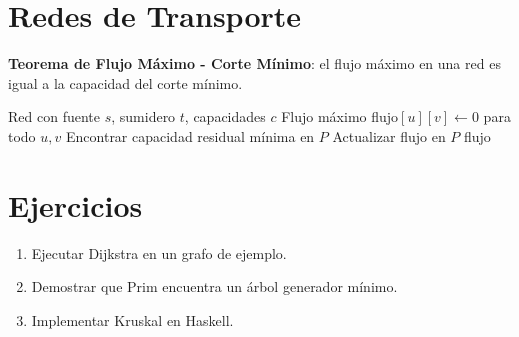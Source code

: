\section{Redes de Transporte}

\textbf{Teorema de Flujo Máximo - Corte Mínimo}: el flujo máximo en una red es igual a la capacidad del corte mínimo.

\begin{algorithm}[htbp]
\caption{Ford-Fulkerson}
\begin{algorithmic}[1]
\Require Red con fuente $s$, sumidero $t$, capacidades $c$
\Ensure Flujo máximo
\State flujo$[u][v] \gets 0$ para todo $u,v$
  \State Encontrar capacidad residual mínima en $P$
  \State Actualizar flujo en $P$
\EndWhile
\State \Return flujo
\end{algorithmic}
\end{algorithm}

\section{Ejercicios}
\begin{enumerate}
  \item Ejecutar Dijkstra en un grafo de ejemplo.
  \item Demostrar que Prim encuentra un árbol generador mínimo.
  \item Implementar Kruskal en Haskell.
\end{enumerate}